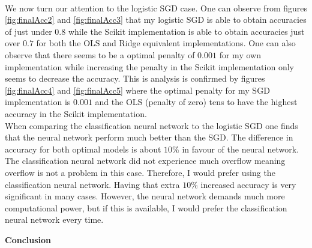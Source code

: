 \documentclass[12pt,a4paper]{article}
\begin{document}
\\
We now turn our attention to the logistic SGD case. One can observe from figures \ref{fig:finalAcc2} and \ref{fig:finalAcc3} that my logistic SGD is able to obtain accuracies of just under $0.8$ while the Scikit implementation is able to obtain accuracies just over $0.7$ for both the OLS and Ridge equivalent implementations. One can also observe that there seems to be a optimal penalty of $0.001$ for my own implementation while increasing the penalty in the Scikit implementation only seems to decrease the accuracy. This is analysis is confirmed by figures \ref{fig:finalAcc4} and \ref{fig:finalAcc5} where the optimal penalty for my SGD implementation is $0.001$ and the OLS (penalty of zero) tens to have the highest accuracy in the Scikit implementation.
\\
When comparing the classification neural network to the logistic SGD one finds that the neural network perform much better than the SGD. The difference in accuracy for both optimal models is about $10\%$ in favour of the neural network. The classification neural network did not experience much overflow meaning overflow is not a problem in this case. Therefore, I would prefer using the classification neural network. Having that extra $10\%$ increased accuracy is very significant in many cases. However, the neural network demands much more computational power, but if this is available, I would prefer the classification neural network every time.

\newpage

\begin{center}
\Large{\textbf{Conclusion}}
\end{center}
\end{document}
